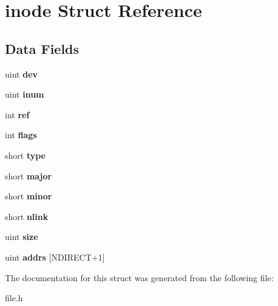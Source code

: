\hypertarget{structinode}{}\section{inode Struct Reference}
\label{structinode}
\subsection*{Data Fields}
\begin{DoxyCompactItemize}
\item 
\mbox{\label{structinode_a121742a89c4531f03a7de1613d5be605}} 
uint {\bfseries dev}
\item 
\mbox{\label{structinode_a8acc2b9df0bfc6856da62925763db7fe}} 
uint {\bfseries inum}
\item 
\mbox{\label{structinode_a6a519028ee67f805482b3e1725bf09c5}} 
int {\bfseries ref}
\item 
\mbox{\label{structinode_a47516965aad946199a3a4c95b884c3b3}} 
int {\bfseries flags}
\item 
\mbox{\label{structinode_a8d74bec2898785c057111c328d23fda2}} 
short {\bfseries type}
\item 
\mbox{\label{structinode_a34af7242018a977dace5730683850875}} 
short {\bfseries major}
\item 
\mbox{\label{structinode_a37878866e7905b666db2aa33076076a2}} 
short {\bfseries minor}
\item 
\mbox{\label{structinode_af8b88b409bea7ef99c49a55f387538b2}} 
short {\bfseries nlink}
\item 
\mbox{\label{structinode_a918af769c48a8ca8afac057bf83d12de}} 
uint {\bfseries size}
\item 
\mbox{\label{structinode_a7ba4ab7e52404b80d6d854678715ae30}} 
uint {\bfseries addrs} \mbox{[}N\+D\+I\+R\+E\+CT+1\mbox{]}
\end{DoxyCompactItemize}


The documentation for this struct was generated from the following file\+:\begin{DoxyCompactItemize}
\item 
file.\+h\end{DoxyCompactItemize}
